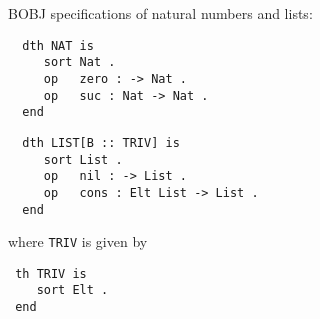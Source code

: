 \documentclass[landscape, autoslides, light]{mmiss}
\newcommand{\ns}{\normalsize}
\newcommand{\CASL}{\textmd{\textsc{Casl}}\xspace }
\begin{document}
\begin{Package}[Label={FSDPT}, Title={Formal Specification of Data and Process Types}, ShortTitle={FSDPT}, Authors={Horst Reichel}, Date={February 2003}, LevelOfDetail=Lecture, Language=en-GB]
\begin{Section}[Title={\CASL specifications}, Label={section7}]
\begin{Paragraph}[Label=Paragraph159]
\end{Paragraph}
\end{Section}
\begin{Section}[Title={BOBJ specifications}, Label={section8}]
\begin{Paragraph}[Label=Paragraph160]
\hypertarget{nat-bobj}{BOBJ specifications of natural numbers and
lists:}\pause
\small
\begin{verbatim}
  dth NAT is
     sort Nat .
     op   zero : -> Nat .
     op   suc : Nat -> Nat .
  end
\end{verbatim}\pause

\begin{verbatim}
  dth LIST[B :: TRIV] is
     sort List .
     op   nil : -> List .
     op   cons : Elt List -> List .
  end
\end{verbatim}

\end{Paragraph}
\begin{Paragraph}[Label=Paragraph161]

where \texttt{TRIV} is given by
\begin{verbatim}
 th TRIV is
    sort Elt .
 end
 \end{verbatim}
 \ns
\end{Paragraph}
\end{Section}
\end{Package}
\end{document}
